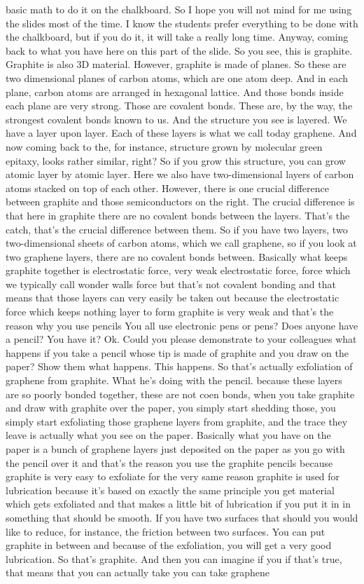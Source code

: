 basic math to do it on the chalkboard. So I hope you will not mind for me using the slides most of the time. I know the students prefer everything to be done with the chalkboard, but if you do it, it will take a really long time. Anyway, coming back to what you have here on this part of the slide. So you see, this is graphite. Graphite is also 3D material. However, graphite is made of planes. So these are two dimensional planes of carbon atoms, which are one atom deep. And in each plane, carbon atoms are arranged in hexagonal lattice. And those bonds inside each plane are very strong. Those are covalent bonds. These are, by the way, the strongest covalent bonds known to us. And the structure you see is layered. We have a layer upon layer. Each of these layers is what we call today graphene. And now coming back to the, for instance, structure grown by molecular green epitaxy, looks rather similar, right? So if you grow this structure, you can grow atomic layer by atomic layer. Here we also have two-dimensional layers of carbon atoms stacked on top of each other. However, there is one crucial difference between graphite and those semiconductors on the right. The crucial difference is that here in graphite there are no covalent bonds between the layers. That's the catch, that's the crucial difference between them. So if you have two layers, two two-dimensional sheets of carbon atoms, which we call graphene, so if you look at two graphene layers, there are no covalent bonds between. Basically what keeps graphite together is electrostatic force, very weak electrostatic force, force which we typically call wonder walls force but that's not covalent bonding and that means that those layers can very easily be taken out because the electrostatic force which keeps nothing layer to form graphite is very weak and that's the reason why you use pencils You all use electronic pens or pens? Does anyone have a pencil? You have it? Ok. Could you please demonstrate to your colleagues what happens if you take a pencil whose tip is made of graphite and you draw on the paper? Show them what happens. This happens. So that's actually exfoliation of graphene from graphite. What he's doing with the pencil. because these layers are so poorly bonded together, these are not coen bonds, when you take graphite and draw with graphite over the paper, you simply start shedding those, you simply start exfoliating those graphene layers from graphite, and the trace they leave is actually what you see on the paper. Basically what you have on the paper is a bunch of graphene layers just deposited on the paper as you go with the pencil over it and that's the reason you use the graphite pencils because graphite is very easy to exfoliate for the very same reason graphite is used for lubrication because it's based on exactly the same principle you get material which gets exfoliated and that makes a little bit of lubrication if you put it in in something that should be smooth. If you have two surfaces that should you would like to reduce, for instance, the friction between two surfaces. You can put graphite in between and because of the exfoliation, you will get a very good lubrication. So that's graphite. And then you can imagine if you if that's true, that means that you can actually take you can take graphene 